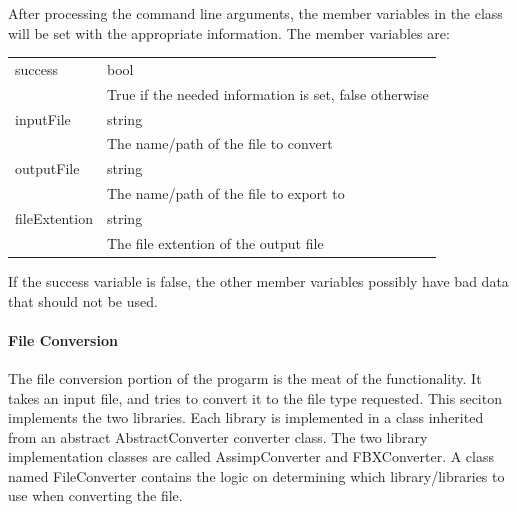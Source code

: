     After processing the command line arguments, the member variables in the class will be set with the appropriate information.  The member variables are:

    \begin{tabular}{l l}
        \centering
        success & bool \\
        & True if the needed information is set, false otherwise \\

        inputFile & string \\
        & The name/path of the file to convert \\

        outputFile & string \\
        & The name/path of the file to export to \\

        fileExtention & string \\
        & The file extention of the output file
    \end{tabular}

    If the success variable is false, the other member variables possibly have bad data that should not be used.

    \paragraph{File Conversion}
    \hfill \break
    The file conversion portion of the progarm is the meat of the functionality.  It takes an input file, and tries to convert it to the file type requested.
    This seciton implements the two libraries.  Each library is implemented in a class inherited from an abstract AbstractConverter converter class.  The two 
    library implementation classes are called AssimpConverter and FBXConverter.  A class named FileConverter contains the logic on determining which 
    library/libraries to use when converting the file.


